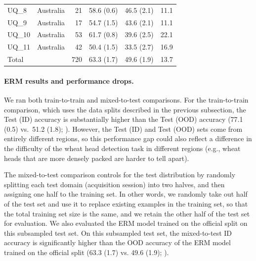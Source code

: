 \begin{table}[!h]
\begin{tabular}{llrrrr}
      UQ\_8       & Australia & 21   &   58.6 (0.6)  &     46.5 (2.1)    & 11.1 \\
      UQ\_9       & Australia & 17   &   54.7 (1.5)  &     43.6 (2.1)    &  11.1 \\
      UQ\_10      & Australia & 53   &   61.7 (0.8)  &     39.6 (2.5)    & 22.1 \\
      UQ\_11      & Australia & 42   &   50.4 (1.5)  &     33.5 (2.7)    & 16.9 \\
    \midrule
      Total       &  & 720 &   63.3 (1.7)  &     49.6 (1.9)    & 13.7 \\
    \bottomrule
    \end{tabular}
  \label{tab:wheat_drop}
\end{table}


\paragraph{ERM results and performance drops.}
We ran both train-to-train and mixed-to-test comparisons.
For the train-to-train comparison, which uses the data splits described in the previous subsection, the Test (ID) accuracy is substantially higher than the Test (OOD) accuracy (77.1 (0.5) vs.~51.2 (1.8); ). However, the Test (ID) and Test (OOD) sets come from entirely different regions, so this performance gap could also reflect a difference in the difficulty of the wheat head detection task in different regions (e.g., wheat heads that are more densely packed are harder to tell apart).

The mixed-to-test comparison controls for the test distribution by randomly splitting each test domain (acquisition session) into two halves, and then assigning one half to the training set. In other words, we randomly take out half of the test set and use it to replace existing examples in the training set, so that the total training set size is the same, and we retain the other half of the test set for evaluation.
We also evaluated the ERM model trained on the official split on this subsampled test set.
On this subsampled test set, the mixed-to-test ID accuracy is significantly higher than the OOD accuracy of the ERM model trained on the official split (63.3 (1.7) vs. 49.6 (1.9); ).

